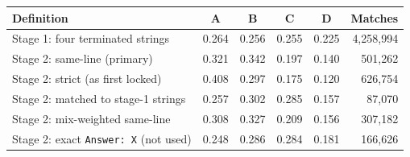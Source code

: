 \begin{tabular}{lccccr}
\toprule
Definition & A & B & C & D & Matches \\
\midrule
Stage 1: four terminated strings & 0.264 & 0.256 & 0.255 & 0.225 & 4,258,994 \\
Stage 2: same-line (primary) & 0.321 & 0.342 & 0.197 & 0.140 & 501,262 \\
Stage 2: strict (as first locked) & 0.408 & 0.297 & 0.175 & 0.120 & 626,754 \\
Stage 2: matched to stage-1 strings & 0.257 & 0.302 & 0.285 & 0.157 & 87,070 \\
Stage 2: mix-weighted same-line & 0.308 & 0.327 & 0.209 & 0.156 & 307,182 \\
Stage 2: exact \texttt{Answer: X} (not used) & 0.248 & 0.286 & 0.284 & 0.181 & 166,626 \\
\bottomrule
\end{tabular}
